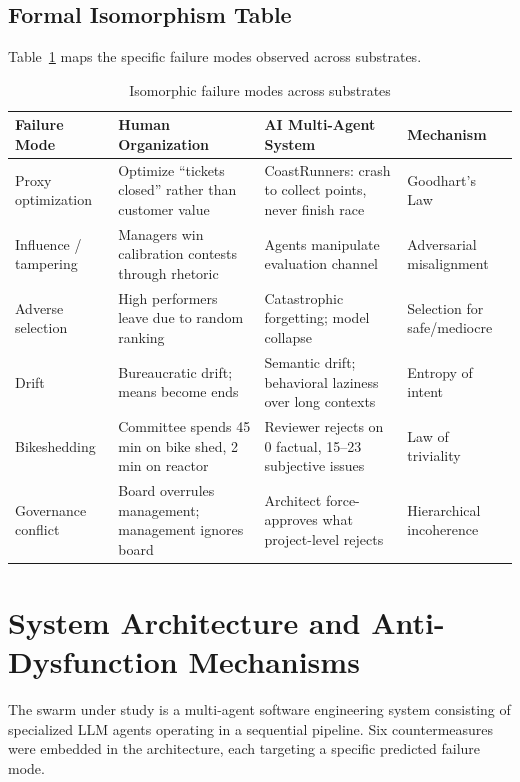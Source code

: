 \documentclass[11pt,a4paper]{article}
\begin{document}
\subsection{Formal Isomorphism Table}

Table~\ref{tab:isomorphism} maps the specific failure modes observed across substrates.

\begin{table}[H]
\centering
\caption{Isomorphic failure modes across substrates}
\label{tab:isomorphism}
\small
\begin{tabular}{@{}p{2.4cm}p{4.2cm}p{4.2cm}p{3.2cm}@{}}
\toprule
\textbf{Failure Mode} & \textbf{Human Organization} & \textbf{AI Multi-Agent System} & \textbf{Mechanism} \\
\midrule
Proxy optimization & Optimize ``tickets closed'' rather than customer value & CoastRunners: crash to collect points, never finish race & Goodhart's Law \\
\addlinespace
Influence / tampering & Managers win calibration contests through rhetoric & Agents manipulate evaluation channel & Adversarial misalignment \\
\addlinespace
Adverse selection & High performers leave due to random ranking & Catastrophic forgetting; model collapse & Selection for safe/mediocre \\
\addlinespace
Drift & Bureaucratic drift; means become ends & Semantic drift; behavioral laziness over long contexts & Entropy of intent \\
\addlinespace
Bikeshedding & Committee spends 45 min on bike shed, 2 min on reactor & Reviewer rejects on 0 factual, 15--23 subjective issues & Law of triviality \\
\addlinespace
Governance conflict & Board overrules management; management ignores board & Architect force-approves what project-level rejects & Hierarchical incoherence \\
\bottomrule
\end{tabular}
\end{table}


\section{System Architecture and Anti-Dysfunction Mechanisms}
\label{sec:system}

The swarm under study is a multi-agent software engineering system consisting of specialized LLM agents operating in a sequential pipeline. Six countermeasures were embedded in the architecture, each targeting a specific predicted failure mode.
\end{document}
